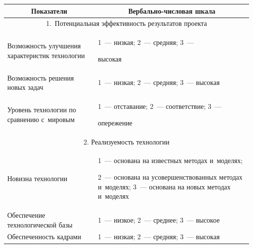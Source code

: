 \begin{table}\small %

\begin{center}


\vspace*{2ex}



\begin{tabular}{|p{40mm}|p{68mm}|}

\hline 

\multicolumn{1}{|c|}{\textbf{Показатели}}&\multicolumn{1}{c|}{\textbf{Вербально-числовая шкала}}\\

\hline

\multicolumn{2}{|c|}{1.\ Потенциальная эффективность результатов проекта}\\

\hline

Возможность улучшения характеристик технологии&1~--- низкая; 2~--- средняя; 3~--- 

высокая\\

\hline

Возможность решения новых задач&1~--- низкая; 2~--- средняя; 3~--- высокая\\

\hline

Уровень технологии по сравнению с~мировым&1~--- отставание; 2~--- соответствие; 3~--- 

опережение\\

\hline

\multicolumn{2}{|c|}{2. Реализуемость технологии}\\

\hline

Новизна технологии&1~--- основана на известных методах и~моделях; 

2~--- основана на усовершенствованных методах и~моделях; 3~--- основана на новых методах и~моделях\\

\hline

Обеспечение технологической базы&1~--- низкое; 2~--- среднее; 3~--- высокое\\

\hline

Обеспеченность кадрами&1~--- низкая; 2~--- средняя; 3~--- высокая\\


\end{tabular}
\end{center}
\end{table}
